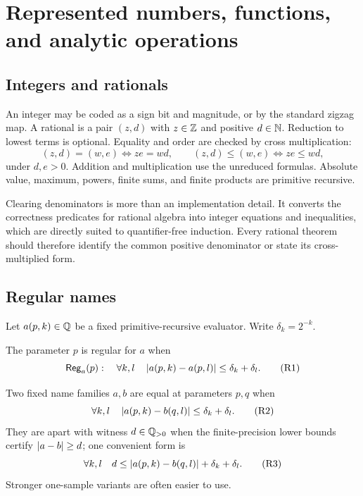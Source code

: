 \section{Represented numbers, functions, and analytic operations}
\label{sec:represented}

\subsection{Integers and rationals}

An integer may be coded as a sign bit and magnitude, or by the standard zigzag
map.  A rational is a pair \((z,d)\) with \(z\in\mathbb Z\) and positive
\(d\in\mathbb N\).  Reduction to lowest terms is optional.  Equality and order are
checked by cross multiplication:
\[
 (z,d)=(w,e)\iff ze=wd,
 \qquad
 (z,d)\le(w,e)\iff ze\le wd,
\]
under \(d,e>0\).  Addition and multiplication use the unreduced formulas.
Absolute value, maximum, powers, finite sums, and finite products are
primitive recursive.

Clearing denominators is more than an implementation detail.  It converts the
correctness predicates for rational algebra into integer equations and
inequalities, which are directly suited to quantifier-free induction.  Every
rational theorem should therefore identify the common positive denominator or
state its cross-multiplied form.

\subsection{Regular names}

Let \(a(p,k)\in\mathbb Q\) be a fixed primitive-recursive evaluator.  Write
\(\delta_k=2^{-k}\).

\begin{definition}
The parameter \(p\) is regular for \(a\) when
\[
 \mathsf{Reg}_a(p):\quad
 \forall k,l\quad
 \left|a(p,k)-a(p,l)\right|\le \delta_k+\delta_l.
 \tag{R1}\label{eq:regular-name}
\]
\end{definition}

\begin{definition}
Two fixed name families \(a,b\) are equal at parameters \(p,q\) when
\[
 \forall k,l\quad
 \left|a(p,k)-b(q,l)\right|\le\delta_k+\delta_l.       \tag{R2}\label{eq:name-eq}
\]
They are apart with witness \(d\in\mathbb Q_{>0}\) when the finite-precision lower
bounds certify \(\left|a-b\right|\ge d\); one convenient form is
\[
 \forall k,l\quad
 d\le \left|a(p,k)-b(q,l)\right|+\delta_k+\delta_l.   \tag{R3}\label{eq:apart}
\]
Stronger one-sample variants are often easier to use.
\end{definition}

